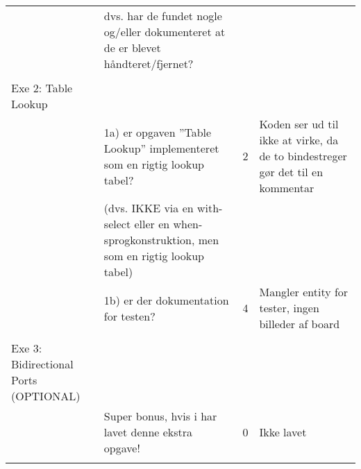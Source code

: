 \begin{table}[h]
\begin{tabularx}{\textwidth}{p{3.5cm}Xp{5mm}X}
                                                               & dvs. har de fundet nogle og/eller dokumenteret at de er blevet håndteret/fjernet?              &   &                                                                   \\
                                                               &                                                                                                &   &                                                                   \\\midrule
        Exe 2: Table Lookup                                    &                                                                                                &   &                                                                   \\
                                                               & 1a) er opgaven ”Table Lookup” implementeret som en rigtig lookup tabel?                        & 2 & Koden ser ud til ikke at virke, da de to bindestreger gør det til en kommentar                                               \\
                                                               & (dvs. IKKE via en with-select eller en when-sprogkonstruktion, men som en rigtig lookup tabel) &   &                                                                   \\
                                                               & 1b) er der dokumentation for testen?                                                           & 4 & Mangler entity for tester, ingen billeder af board                                            \\
                                                               &                                                                                                &   &                                                                   \\\midrule
        Exe 3: Bidirectional Ports (OPTIONAL)                  &                                                                                                &   &                                                                   \\
                                                               & Super bonus, hvis i har lavet denne ekstra opgave!                                             & 0 & Ikke lavet                                                                   \\
                                                               &
    \end{tabularx}
\end{table}
